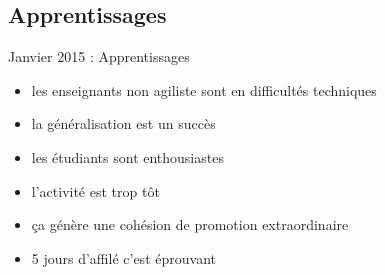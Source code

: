 \documentclass{beamer}
\begin{document}
\subsection{Apprentissages}
\begin{frame}{Janvier 2015 : Apprentissages}
  \begin{itemize}
    \item les enseignants non agiliste sont en difficultés techniques
    \item la généralisation est un succès
    \item les étudiants sont enthousiastes
    \item l'activité est trop tôt
    \item ça génère une cohésion de promotion extraordinaire
    \item 5 jours d'affilé c'est éprouvant
  \end{itemize}
\end{frame}

\end{document}

